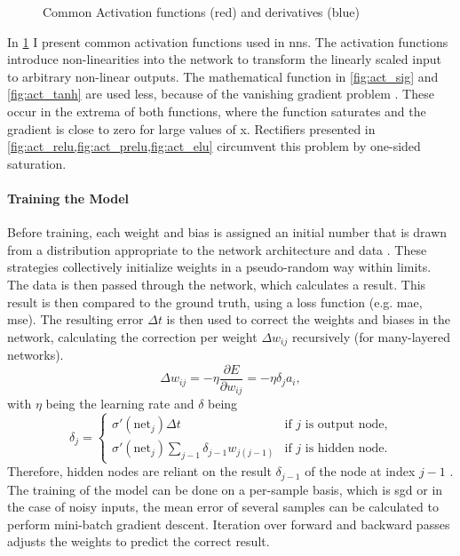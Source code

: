 \begin{figure}[H]
    \caption{Common Activation functions (red) and derivatives (blue)}
    \label{fig:activations}
\end{figure}

In \cref{fig:activations} I present common activation functions used in \acp{nn}. The activation functions introduce non-linearities into the network to transform the linearly scaled input to arbitrary non-linear outputs. The mathematical function in \cref{fig:act_sig} and \cref{fig:act_tanh} are used less, because of the vanishing gradient problem \citep{hochreiter1991untersuchungen}. These occur in the extrema of both functions, where the function saturates and the gradient is close to zero for large values of x. Rectifiers presented in \cref{fig:act_relu,fig:act_prelu,fig:act_elu} circumvent this problem by one-sided saturation. 

\paragraph{Training the Model} 
Before training, each weight and bias is assigned an initial number that is drawn from a distribution appropriate to the network architecture and data \citep{lecun2012efficient, glorot2010understanding, he2015delving}. These strategies collectively initialize weights in a pseudo-random way within limits. The data is then passed through the network, which calculates a result. This result is then compared to the ground truth, using a loss function (e.g. \ac{mae}, \ac{mse}). The resulting error $\Delta t$ is then used to correct the weights and biases in the network, calculating the correction per weight $\Delta w_{ij}$ recursively (for many-layered networks).
\begin{equation}
    \Delta w_{ij}= -\eta \dfrac{\partial E}{\partial w_{ij}} = -\eta \delta_{j} a_{i},
\end{equation}
with $\eta$ being the learning rate and $\delta$ being
\begin{equation}
    \delta_{j}=\begin{cases}
\sigma'( \text{net}_{j} ) \Delta t              & \text{if } j \text{ is output node,}\\
\sigma'( \text{net}_{j} ) \sum_{j-1} \delta_{j-1} w_{j(j-1)} & \text{if } j \text{ is hidden node.}
\end{cases}
\end{equation}
Therefore, hidden nodes are reliant on the result $\delta_{j-1}$ of the node at index $j-1$ \citep{deeplearningbook}. The training of the model can be done on a per-sample basis, which is \ac{sgd} or in the case of noisy inputs, the mean error of several samples can be calculated to perform mini-batch gradient descent. Iteration over forward and backward passes adjusts the weights to predict the correct result. 


